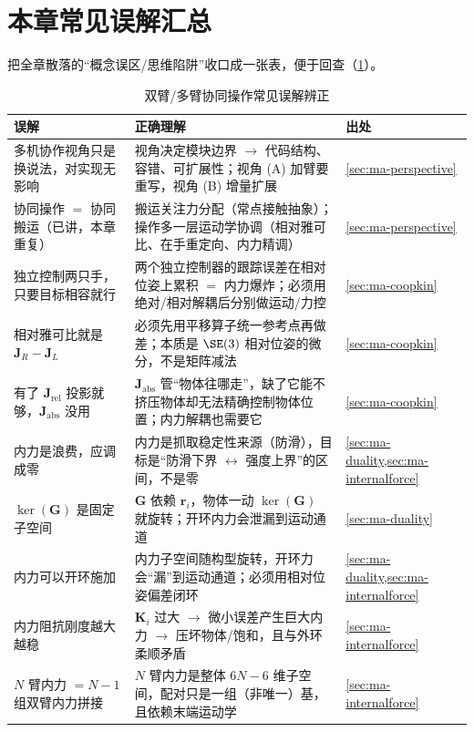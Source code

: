 \section*{本章常见误解汇总}

把全章散落的“概念误区/思维陷阱”收口成一张表，便于回查（\cref{tab:ma-misconceptions}）。

\begin{table}[H]\centering\small
\caption{双臂/多臂协同操作常见误解辨正}
\label{tab:ma-misconceptions}
\begin{tabular}{p{5.6cm}p{7.0cm}p{1.4cm}}
\toprule
误解 & 正确理解 & 出处 \\
\midrule
多机协作视角只是换说法，对实现无影响 & 视角决定模块边界 $\to$ 代码结构、容错、可扩展性；视角 (A) 加臂要重写，视角 (B) 增量扩展 & \cref{sec:ma-perspective} \\
协同操作 $=$ 协同搬运（已讲，本章重复） & 搬运关注力分配（常点接触抽象）；操作多一层运动学协调（相对雅可比、在手重定向、内力精调） & \cref{sec:ma-perspective} \\
独立控制两只手，只要目标相容就行 & 两个独立控制器的跟踪误差在相对位姿上累积 $=$ 内力爆炸；必须用绝对/相对解耦后分别做运动/力控 & \cref{sec:ma-coopkin} \\
相对雅可比就是 $\mathbf{J}_R-\mathbf{J}_L$ & 必须先用平移算子统一参考点再做差；本质是 $\SE(3)$ 相对位姿的微分，不是矩阵减法 & \cref{sec:ma-coopkin} \\
有了 $\mathbf{J}_{\text{rel}}$ 投影就够，$\mathbf{J}_{\text{abs}}$ 没用 & $\mathbf{J}_{\text{abs}}$ 管“物体往哪走”，缺了它能不挤压物体却无法精确控制物体位置；内力解耦也需要它 & \cref{sec:ma-coopkin} \\
内力是浪费，应调成零 & 内力是抓取稳定性来源（防滑），目标是“防滑下界 $\leftrightarrow$ 强度上界”的区间，不是零 & \cref{sec:ma-duality,sec:ma-internalforce} \\
$\ker(\mathbf{G})$ 是固定子空间 & $\mathbf{G}$ 依赖 $\mathbf{r}_i$，物体一动 $\ker(\mathbf{G})$ 就旋转；开环内力会泄漏到运动通道 & \cref{sec:ma-duality} \\
内力可以开环施加 & 内力子空间随构型旋转，开环力会“漏”到运动通道；必须用相对位姿偏差闭环 & \cref{sec:ma-duality,sec:ma-internalforce} \\
内力阻抗刚度越大越稳 & $\mathbf{K}_i$ 过大 $\to$ 微小误差产生巨大内力 $\to$ 压坏物体/饱和，且与外环柔顺矛盾 & \cref{sec:ma-internalforce} \\
$N$ 臂内力 $=N-1$ 组双臂内力拼接 & $N$ 臂内力是整体 $6N-6$ 维子空间，配对只是一组（非唯一）基，且依赖末端运动学 & \cref{sec:ma-internalforce} \\

\end{tabular}
\end{table}
